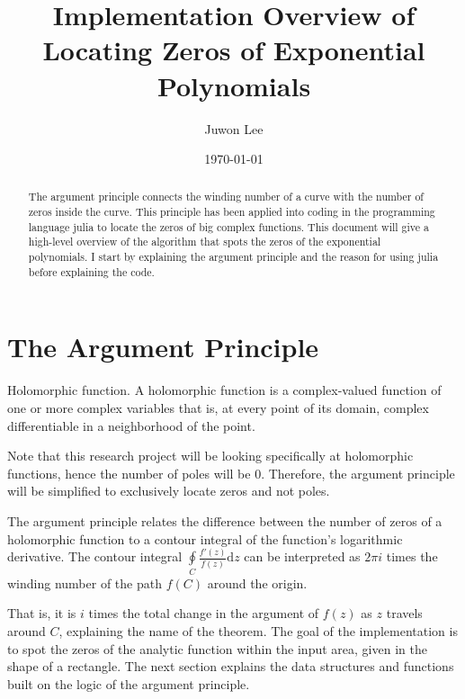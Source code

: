 \documentclass[11pt,reqno,oneside,a4paper]{article}
\author{Juwon Lee}
\title{Implementation Overview of Locating Zeros of Exponential Polynomials}
\date{\today}
\begin{document}
\maketitle
\thispagestyle{fancy}

\begin{abstract}
	The argument principle connects the winding number of a curve with the number of zeros inside the curve. 
	This principle has been applied into coding in the programming language julia to locate the zeros of big complex functions.
	This document will give a high-level overview of the algorithm that spots the zeros of the exponential polynomials.
	I start by explaining the argument principle and the reason for using julia before explaining the code.
\end{abstract}

\section{The Argument Principle}
	
\begin{defn}{Holomorphic function.}
A holomorphic function is a complex-valued function of one or more complex variables that is, at every point of its domain, complex differentiable in a neighborhood of the point. 
\end{defn}

Note that this research project will be looking specifically at holomorphic functions, hence the number of poles will be $0.$ 
Therefore, the argument principle will be simplified to exclusively locate zeros and not poles.

\begin{thm}
The argument principle relates the difference between the number of zeros of a holomorphic function to a contour integral of the function's logarithmic derivative. 
The contour integral $\oint\limits_{C} \frac{f'(z)}{f(z)}\mathrm{d}z $ can be interpreted as $2\pi i$ times the winding number of the path $f(C)$ around the origin. 
\end{thm}

That is, it is $i$ times the total change in the argument of $f(z)$ as $z$ travels around $C$, explaining the name of the theorem. 
The goal of the implementation is to spot the zeros of the analytic function within the input area, given in the shape of a rectangle.
The next section explains the data structures and functions built on the logic of the argument principle.
\end{document}
